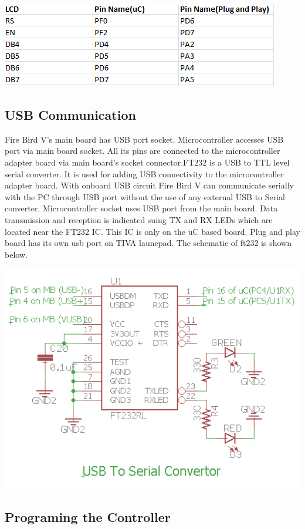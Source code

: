 \documentclass[a4paper,10pt,oneside]{article}
\begin{document}
{\begin{center}
		\includegraphics{lcdpin}
		\end{center}
	\subsection{\huge \textbf{USB Communication}}
	{Fire Bird V’s main board has USB port socket. Microcontroller accesses USB port via main
		board socket. All its pins are connected to the microcontroller adapter board via main board's
		socket connector.FT232 is a USB to TTL level serial converter. It is used for adding USB connectivity to the
		microcontroller adapter board. With onboard USB circuit Fire Bird V can communicate serially
		with the PC through USB port without the use of any external USB to Serial converter.
		Microcontroller socket uses USB port from the main board. Data transmission and reception is
		indicated suing TX and RX LEDs which are located near the FT232 IC. This IC is only on the uC based board. Plug and play board has its own usb port on TIVA launcpad. The schematic of ft232 is shown below.}
		\begin{center}
		\includegraphics{ft232}\\
		\end{center}
	\subsection{\huge \textbf{Programing the Controller}}
}
\end{document}
